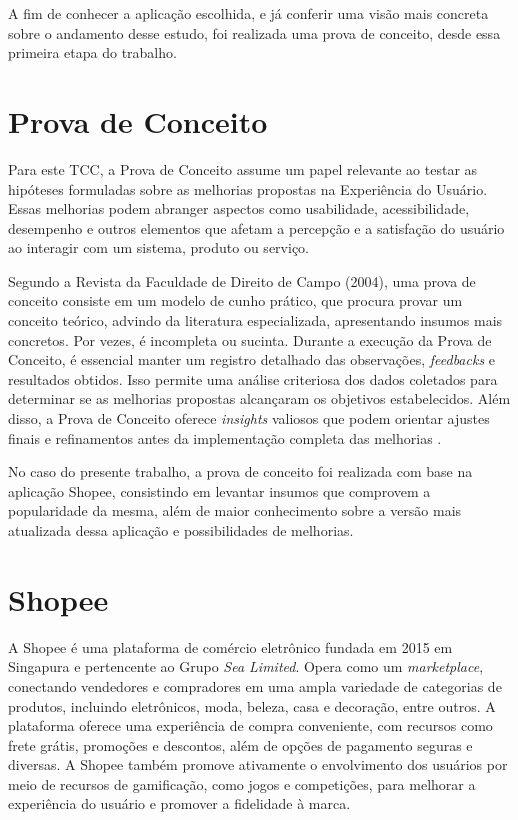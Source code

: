 A fim de conhecer a aplicação escolhida, e já conferir uma visão mais concreta sobre o andamento desse estudo, foi realizada uma prova de conceito, desde essa primeira etapa do trabalho.

\section{Prova de Conceito}
    \label{ProvaConceito}

Para este TCC, a Prova de Conceito assume um papel relevante ao testar as hipóteses formuladas sobre as melhorias propostas na Experiência do Usuário. Essas melhorias podem abranger aspectos como usabilidade, acessibilidade, desempenho e outros elementos que afetam a percepção e a satisfação do usuário ao interagir com um sistema, produto ou serviço.

Segundo a Revista da Faculdade de Direito de Campo (2004), uma prova de conceito consiste em um modelo de cunho prático, que procura provar um conceito teórico, advindo da literatura especializada, apresentando insumos mais concretos. Por vezes, é incompleta ou sucinta. Durante a execução da Prova de Conceito, é essencial manter um registro detalhado das observações, \textit{feedbacks} e resultados obtidos. Isso permite uma análise criteriosa dos dados coletados para determinar se as melhorias propostas alcançaram os objetivos estabelecidos. Além disso, a Prova de Conceito oferece \textit{insights} valiosos que podem orientar ajustes finais e refinamentos antes da implementação completa das melhorias \cite{ProvaConceito}.

No caso do presente trabalho, a prova de conceito foi realizada com base na aplicação Shopee, consistindo em levantar insumos que comprovem a popularidade da mesma, além de maior conhecimento sobre a versão mais atualizada dessa aplicação e possibilidades de melhorias.

\section{Shopee}
    \label{Shopee}
    
A Shopee é uma plataforma de comércio eletrônico fundada em 2015 em Singapura e pertencente ao Grupo \textit{Sea Limited}. Opera como um \textit{marketplace}, conectando vendedores e compradores em uma ampla variedade de categorias de produtos, incluindo eletrônicos, moda, beleza, casa e decoração, entre outros. A plataforma oferece uma experiência de compra conveniente, com recursos como frete grátis, promoções e descontos, além de opções de pagamento seguras e diversas. A Shopee também promove ativamente o envolvimento dos usuários por meio de recursos de gamificação, como jogos e competições, para melhorar a experiência do usuário e promover a fidelidade à marca.

